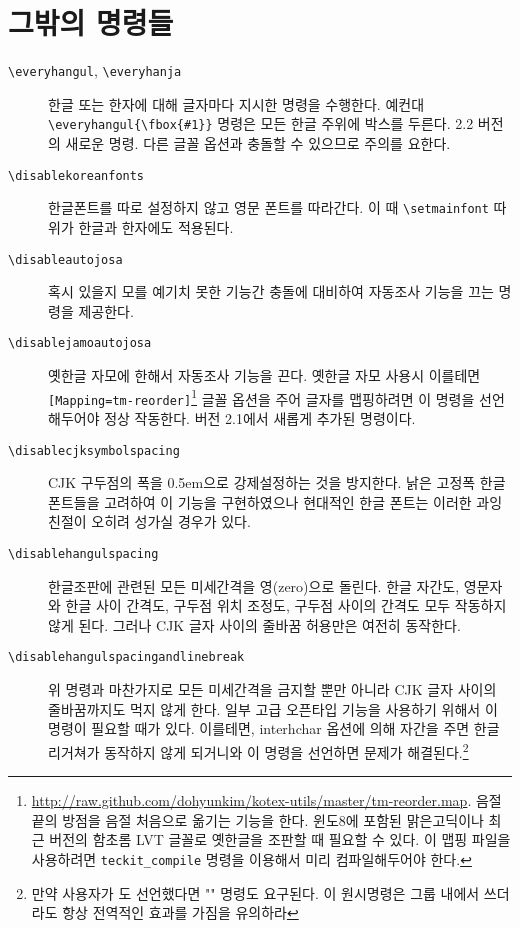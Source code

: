 \documentclass[a4paper]{article}
\def\logoko{\textsf{k}\kern-.2ex\textit{o}}
\def\XeTeX{\hologo{XeTeX}}
\def\xetexko{\XeTeX\kern-.1ex -\logoko}
\def\cs#1{\texttt{\textbackslash #1}}
\begin{document}
\section{그밖의 명령들}
\begin{description}
  \item[\cs{everyhangul}, \cs{everyhanja}]
    한글 또는 한자에 대해 글자마다 지시한 명령을 수행한다. 예컨대
    \verb|\everyhangul{\fbox{#1}}| 명령은 모든
    {\fboxsep=0.4pt 한글 주위에 박스}를
    두른다.  2.2 버전의 새로운 명령. 다른 글꼴 옵션과 충돌할 수 있으므로
    주의를 요한다.

  \item[\cs{disablekoreanfonts}]
한글폰트를 따로 설정하지 않고 영문 폰트를 따라간다.
이 때  \verb|\setmainfont| 따위가 한글과 한자에도 적용된다.

  \item[\cs{disableautojosa}]
혹시 있을지 모를 예기치 못한 기능간 충돌에 대비하여 자동조사 기능을
끄는 명령을 제공한다.

  \item[\cs{disablejamoautojosa}]
옛한글 자모에 한해서 자동조사 기능을 끈다.
옛한글 자모 사용시 이를테면 \verb|[Mapping=tm-reorder]|\footnote{%
  \url{http://raw.github.com/dohyunkim/kotex-utils/master/tm-reorder.map}.
  음절 끝의 방점을 음절 처음으로 옮기는 기능을 한다.  윈도8에 포함된
  맑은고딕이나 최근 버전의 함초롬 LVT 글꼴로 옛한글을 조판할 때 필요할 수
  있다. 이 맵핑 파일을 사용하려면 \texttt{teckit\_compile} 명령을 이용해서
  미리 컴파일해두어야 한다.}
글꼴 옵션을 주어 글자를 맵핑하려면 이 명령을 선언해두어야 정상 작동한다.
버전 2.1에서 새롭게 추가된 명령이다.

  \item[\cs{disablecjksymbolspacing}]
CJK 구두점의 폭을 0.5em으로 강제설정하는 것을 방지한다.
 낡은 고정폭 한글 폰트들을 고려하여 이 기능을 구현하였으나
현대적인 한글 폰트는 이러한 과잉친절이 오히려 성가실 경우가 있다.

  \item[\cs{disablehangulspacing}]
한글조판에 관련된 모든 미세간격을 영(zero)으로 돌린다. 한글 자간도,
영문자와 한글 사이 간격도, 구두점 위치 조정도, 구두점 사이의 간격도
모두 작동하지 않게 된다. 그러나 CJK 글자 사이의 줄바꿈 허용만은 여전히
동작한다.

  \item[\cs{disablehangulspacingandlinebreak}]
위 명령과 마찬가지로 모든 미세간격을 금지할 뿐만 아니라 CJK 글자 사이의
줄바꿈까지도 먹지 않게 한다.
일부 고급 오픈타입 기능을 사용하기 위해서 이 명령이 필요할 때가 있다.
이를테면, interhchar 옵션에 의해 자간을 주면 한글 리거쳐가
동작하지 않게 되거니와 이 명령을 선언하면 문제가
해결된다.\footnote{만약 사용자가
  {\ttfamily\string\XeTeXlinebreaklocale}도 선언했다면
  {\ttfamily\string\XeTeXlinebreaklocale""} 명령도 요구된다.
  이 원시명령은 그룹 내에서 쓰더라도 항상 전역적인 효과를 가짐을 유의하라}
\end{description}
\end{document}
